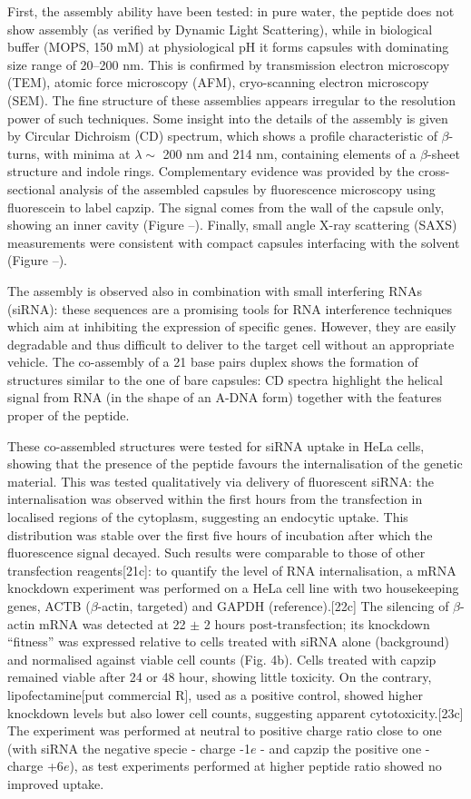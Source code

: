 First, the assembly ability have been tested: in pure water, the peptide does not show assembly (as verified by Dynamic Light Scattering), while in biological buffer (MOPS, 150 mM) at physiological pH it forms capsules with dominating size range of 20–200 nm. This is confirmed by transmission electron microscopy (TEM), atomic force microscopy (AFM), cryo-scanning electron microscopy (SEM).
%
The fine structure of these assemblies appears irregular to the resolution power of such techniques. Some insight into the details of the assembly is given by Circular Dichroism (CD) spectrum, which shows a profile characteristic of $\beta$-turns, with minima at $\lambda \sim$ 200 nm and 214 nm, containing elements of a $\beta$-sheet structure and indole rings.
%
Complementary evidence was provided by the cross-sectional analysis of the assembled capsules by fluorescence microscopy using fluorescein to label capzip. The signal comes from the wall of the capsule only, showing an inner cavity (Figure --).
%
Finally, small angle X-ray scattering (SAXS) measurements were consistent with compact capsules interfacing with the solvent (Figure --).

The assembly is observed also in combination with small interfering RNAs (siRNA): these sequences are a promising tools for RNA interference techniques which aim at inhibiting the expression of specific genes. However, they are easily degradable and thus difficult to deliver to the target cell without an appropriate vehicle.
%
The co-assembly of a 21 base pairs duplex shows the formation of structures similar to the one of bare capsules: CD spectra highlight the helical signal from RNA (in the shape of an A-DNA form) together with the features proper of the peptide.

These co-assembled structures were tested for siRNA uptake in HeLa cells, showing that the presence of the peptide favours the internalisation of the genetic material. This was tested qualitatively via delivery of fluorescent siRNA: the internalisation was observed within the first hours from the transfection in localised regions of the cytoplasm, suggesting an endocytic uptake. This distribution was stable over the first five hours of incubation after which the fluorescence signal decayed.
%
Such results were comparable to those of other transfection reagents[21c]: to quantify the level of RNA internalisation, a mRNA knockdown experiment was performed on a HeLa cell line with two housekeeping genes, ACTB ($\beta$-actin, targeted) and GAPDH (reference).[22c]
%
The silencing of $\beta$-actin mRNA was detected at 22 $\pm$ 2 hours post-transfection; its knockdown ``fitness” was expressed relative to cells treated with siRNA alone (background) and normalised against viable cell counts (Fig. 4b). Cells treated with capzip remained viable after 24 or 48 hour, showing little toxicity.
%
On the contrary, lipofectamine[put commercial R], used as a positive control, showed higher knockdown levels but also lower cell counts, suggesting apparent cytotoxicity.[23c]
%
The experiment was performed at neutral to positive charge ratio close to one (with siRNA the negative specie - charge -1$e$ - and capzip the positive one - charge +6$e$), as test experiments performed at higher peptide ratio showed no improved uptake.

